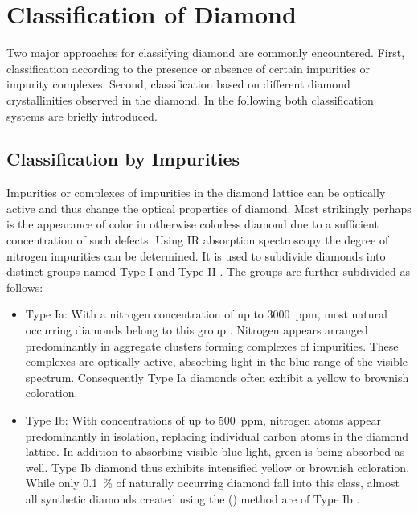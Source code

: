 \section{Classification of Diamond}

  Two major approaches for classifying diamond are commonly encountered. First, classification according to the presence or absence of certain impurities or impurity complexes. Second, classification based on different diamond crystallinities observed in the diamond. In the following both classification systems are briefly introduced.

  \subsection{Classification by Impurities}

    Impurities or complexes of impurities in the diamond lattice can be optically active and thus change the optical properties of diamond. Most strikingly perhaps is the appearance of color in otherwise colorless diamond due to a sufficient concentration of such defects. Using IR absorption spectroscopy the degree of nitrogen impurities can be determined. It is used to subdivide diamonds into distinct groups named Type I and Type II \cite{Kaiser1959, Breeding2009}. The groups are further subdivided as follows:

    \begin{itemize}
          \item Type Ia: With a nitrogen concentration of up to \SI{3000}{ppm}, most natural occurring diamonds belong to this group \cite{Zaitsev2001}. Nitrogen appears arranged predominantly in aggregate clusters forming complexes of impurities. These complexes are optically active, absorbing light in the blue range of the visible spectrum. Consequently Type Ia diamonds often exhibit a yellow to brownish coloration.

          \item Type Ib: With concentrations of up to \SI{500}{ppm}, nitrogen atoms appear predominantly in isolation, replacing individual carbon atoms in the diamond lattice. In addition to absorbing visible blue light, green is being absorbed as well. Type Ib diamond thus exhibits intensified yellow or brownish coloration. While only \SI{0.1}{\percent} of naturally occurring diamond fall into this class, almost all synthetic diamonds created using the \hpht (\HPHT) method are of Type Ib \cite{Zaitsev2001}.
    \end{itemize}

